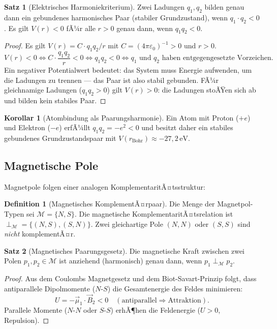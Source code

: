 ﻿\documentclass[a4paper,12pt]{article}
\theoremstyle{definition}
\newtheorem{definition}{Definition}
\newtheorem{satz}{Satz}
\newtheorem{korollar}{Korollar}
\begin{document}
\begin{satz}[Elektrisches Harmoniekriterium]
	\label{satz:coulomb}
	Zwei Ladungen $q_1, q_2$ bilden genau dann ein gebundenes harmonisches Paar
	(stabiler Grundzustand), wenn $q_1 \cdot q_2 < 0$.
	Es gilt $V(r) < 0$ fÃ¼r alle $r > 0$ genau dann, wenn $q_1 q_2 < 0$.
\end{satz}

\begin{proof}
	Es gilt $V(r) = C \cdot q_1 q_2 / r$ mit $C = (4\pi\varepsilon_0)^{-1} > 0$ und $r > 0$.
	\[
		V(r) < 0
		\iff C \cdot \frac{q_1 q_2}{r} < 0
		\iff q_1 q_2 < 0
		\iff q_1 \text{ und } q_2 \text{ haben entgegengesetzte Vorzeichen.}
	\]
	Ein negativer Potentialwert bedeutet: das System muss Energie aufwenden, um die
	Ladungen zu trennen --- das Paar ist also stabil gebunden.
	FÃ¼r gleichnamige Ladungen ($q_1 q_2 > 0$) gilt $V(r) > 0$: die Ladungen stoÃŸen
	sich ab und bilden kein stabiles Paar.
\end{proof}

\begin{korollar}[Atombindung als Paarungsharmonie]
	Ein Atom mit Proton ($+e$) und Elektron ($-e$) erfÃ¼llt $q_1 q_2 = -e^2 < 0$ und
	besitzt daher ein stabiles gebundenes Grundzustandspaar mit
	$V(r_{\mathrm{Bohr}}) \approx -27{,}2\,\mathrm{eV}$.
\end{korollar}

\subsection{Magnetische Pole}

Magnetpole folgen einer analogen KomplementaritÃ¤tsstruktur:

\begin{definition}[Magnetisches KomplementÃ¤rpaar]
	Die Menge der Magnetpol-Typen sei $\mathcal{M} = \{N, S\}$.
	Die magnetische KomplementaritÃ¤tsrelation ist
	$\perp_{\mathcal{M}} = \{(N, S), (S, N)\}$.
	Zwei gleichartige Pole $(N,N)$ oder $(S,S)$ sind \emph{nicht} komplementÃ¤r.
\end{definition}

\begin{satz}[Magnetisches Paarungsgesetz]
	\label{satz:magnet}
	Die magnetische Kraft zwischen zwei Polen $p_1, p_2 \in \mathcal{M}$ ist anziehend
	(harmonisch) genau dann, wenn $p_1 \perp_{\mathcal{M}} p_2$.
\end{satz}

\begin{proof}
	Aus dem Coulombs Magnetgesetz und dem Biot-Savart-Prinzip folgt, dass
	antiparallele Dipolmomente ($N$-$S$) die Gesamtenergie des Feldes minimieren:
	\[
		U = -\vec{\mu}_1 \cdot \vec{B}_2 < 0 \quad (\text{antiparallel} \Rightarrow \text{Attraktion}).
	\]
	Parallele Momente ($N$-$N$ oder $S$-$S$) erhÃ¶hen die Feldenergie ($U > 0$,
	Repulsion). \qedhere
\end{proof}
\end{document}
